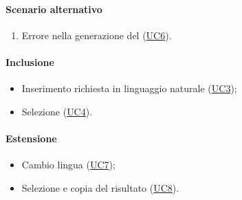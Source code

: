 \paragraph*{Scenario alternativo}
\begin{enumerate}
  \item Errore nella generazione del  (\hyperref[UC6]{UC6}).
\end{enumerate}

\paragraph*{Inclusione}
\begin{itemize}
  \item Inserimento richiesta in linguaggio naturale (\hyperref[UC3]{UC3});
  \item Selezione  (\hyperref[UC4]{UC4}).
\end{itemize}

\paragraph*{Estensione}
\begin{itemize}
  \item Cambio lingua (\hyperref[UC7]{UC7});
  \item Selezione e copia del  risultato (\hyperref[UC8]{UC8}).
\end{itemize}
